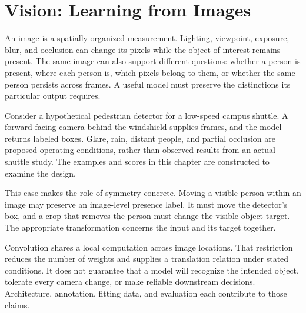 \begingroup
\raggedbottom
{}
\chapter{Vision: Learning from Images}
\label{ch:vision}

An image is a spatially organized measurement. Lighting, viewpoint, exposure, blur, and occlusion can change its pixels while the object of interest remains present. The same image can also support different questions: whether a person is present, where each person is, which pixels belong to them, or whether the same person persists across frames. A useful model must preserve the distinctions its particular output requires.

Consider a hypothetical pedestrian detector for a low-speed campus shuttle. A forward-facing camera behind the windshield supplies frames, and the model returns labeled boxes. Glare, rain, distant people, and partial occlusion are proposed operating conditions, rather than observed results from an actual shuttle study. The examples and scores in this chapter are constructed to examine the design.

This case makes the role of symmetry concrete. Moving a visible person within an image may preserve an image-level presence label. It must move the detector's box, and a crop that removes the person must change the visible-object target. The appropriate transformation concerns the input and its target together.

Convolution shares a local computation across image locations. That restriction reduces the number of weights and supplies a translation relation under stated conditions. It does not guarantee that a model will recognize the intended object, tolerate every camera change, or make reliable downstream decisions. Architecture, annotation, fitting data, and evaluation each contribute to those claims.

\par\addvspace{\intextsep}\noindent\begin{minipage}{\linewidth}
\centering

\label{fig:vision-pipeline}
\end{minipage}\par\addvspace{\intextsep}

